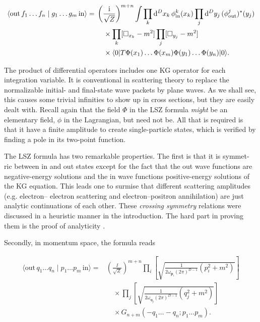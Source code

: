 \[
\begin{aligned}
\langle \mathrm{out}\,f_1\ldots f_n\mid g_1\ldots g_m\,\mathrm{in}\rangle
={}&\left(\frac{\mathrm{i}}{\sqrt Z}\right)^{m+n}
\int\prod_k\mathop{}\!\mathrm{d}^D x_k\,\phi^k_{\rm in}(x_k)\prod_j\mathop{}\!\mathrm{d}^D y_j\,(\phi^j_{\rm out})^*(y_j)\\
&\quad\times\prod_k[\Box_{x_k}-m^2]\prod_j[\Box_{y_j}-m^2]\\
&\quad\times\langle0|T\Phi(x_1)\ldots\Phi(x_m)\Phi(y_1)\ldots\Phi(y_n)|0\rangle.
\end{aligned}
\]

The product of differential operators includes one KG operator for each integration
variable. It is conventional in scattering theory to replace the normalizable initial- and
final-state wave packets by plane waves. As we shall see, this causes some trivial infinities
to show up in cross sections, but they are easily dealt with. Recall again that the field
$\Phi$ in the LSZ formula \emph{might} be an elementary field, $\phi$ in the Lagrangian, but need not
be. All that is required is that it have a finite amplitude to create single-particle states,
which is verified by finding a pole in its two-point function.

The LSZ formula has two remarkable properties. The first is that it is symmet-
ric between in and out states except for the fact that the out wave functions are
negative-energy solutions and the in wave functions positive-energy solutions of the KG
equation. This leads one to surmise that different scattering amplitudes (e.g. electron--
electron scattering and electron--positron annihilation) are just analytic continuations
of each other. These \emph{crossing symmetry} relations were discussed in a heuristic manner
in the introduction. The hard part in proving them is the proof of analyticity \cite{banks-ref-23}.

Secondly, in momentum space, the formula reads

\[
\begin{aligned}
\langle \mathrm{out}\,q_1\ldots q_n\mid p_1\ldots p_m\,\mathrm{in}\rangle
={}&\left(\frac{\ii}{\sqrt Z}\right)^{m+n}
\prod_i\left[\sqrt{\frac{1}{2\omega_{\mathbf p_i}(2\pi)^{D-1}}(p_i^2+m^2)}\right]\\
&\quad\times\prod_j\left[\sqrt{\frac{1}{2\omega_{\mathbf q_j}(2\pi)^{D-1}}(q_j^2+m^2)}\right]\\
&\quad\times G_{n+m}(-q_1\ldots-q_n;p_1\ldots p_m).
\end{aligned}
\]

